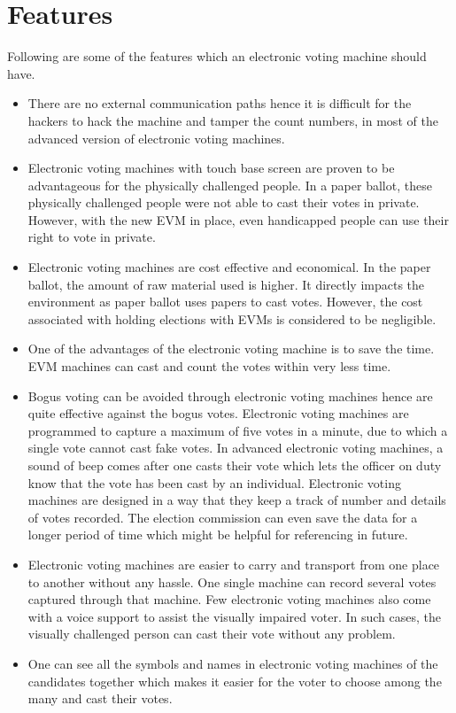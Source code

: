 \section{Features}
Following are some of the features which an electronic voting machine should have.
\begin{itemize}
\item There are no external communication paths hence it is difficult for the hackers to hack the machine and tamper the count numbers, in most of the advanced version of electronic voting machines.
%
\item Electronic voting machines with touch base screen are proven to be advantageous for the physically challenged people. In a paper ballot, these physically challenged people were not able to cast their votes in private. However, with the new EVM in place, even handicapped people can use their right to vote in private.
%
\item Electronic voting machines are cost effective and economical. In the paper ballot, the amount of raw material used is higher. It directly impacts the environment as paper ballot uses papers to cast votes. However, the cost associated with holding elections with EVMs is considered to be negligible.
%
\item One of the advantages of the electronic voting machine
is to save the time. EVM machines can cast and count the votes within very less time.
%
\item Bogus voting can be avoided through electronic voting machines hence are quite effective against the bogus votes. Electronic voting machines are programmed to capture a maximum of five votes in a minute, due to which a single vote cannot cast fake votes. In advanced electronic voting machines, a sound of beep comes after one casts their vote which lets the officer on duty know that the vote has been cast by an individual.
Electronic voting machines are designed in a way that they keep a track of number and details of votes recorded. The election commission can even save the data for a longer period of time which might be helpful for referencing in future.
%
\item Electronic voting machines are easier to carry and transport from one place to another without any hassle. One single machine can record several votes captured through that machine. Few electronic voting machines also come with a voice support to assist the visually impaired voter. In such cases, the visually challenged person can cast their vote without any problem.
\item One can see all the symbols and names in electronic voting machines of the candidates together which makes it easier for the voter to choose among the many and cast their votes.
%
\end{itemize}
